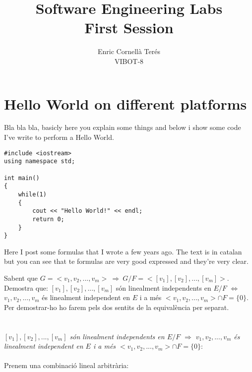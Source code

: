 \documentclass{article}
\title{Software Engineering Labs\\
		First Session}
\author{Enric Cornellà Terés\\
		VIBOT-8}
\date{}
\begin{document}
\maketitle

\section{Hello World on different platforms}
Bla bla bla, basicly here you explain some things and below i show some code I've write to perform a Hello World.



\begin{lstlisting}
#include <iostream>
using namespace std;

int main()
{
    while(1)
    {
        cout << "Hello World!" << endl;
        return 0;
    }
}
\end{lstlisting}

Here I post some formulas that I wrote a few years ago. The text is in catalan but you can see that te formulas are very good expressed and they're very clear.

Sabent que $G=< v_1, v_2 , ... , v_m> ~\Rightarrow ~G/F = < \left[v_1 \right], \left[ v_2 \right], ... , \left[ v_m \right] >$. Demostra que: $\left[v_1 \right], \left[ v_2 \right], ... , \left[ v_m \right] $ s\'on linealment independents en $E/F$ $\Leftrightarrow$ $v_1, v_2 , ... , v_m$ \'es linealment independent en $E$ i a m\'es $< v_1, v_2 , ... , v_m>\cap F = \{0\}$. \\ \indent
Per demostrar-ho ho farem pels dos sentits de la equival\`encia per separat. \\ \\ \\ \indent
\emph{$\left[v_1 \right], \left[ v_2 \right], ... , \left[ v_m \right] $ s\'on linealment independents en $E/F$ $\Rightarrow$ $v_1, v_2 , ... , v_m$ \'es linealment independent en $E$ i a m\'es $< v_1, v_2 , ... , v_m>\cap F = \{0\}$}: \\ \\ \indent
Prenem una combinaci\'o lineal arbitr\`aria:
	
\end{document}
